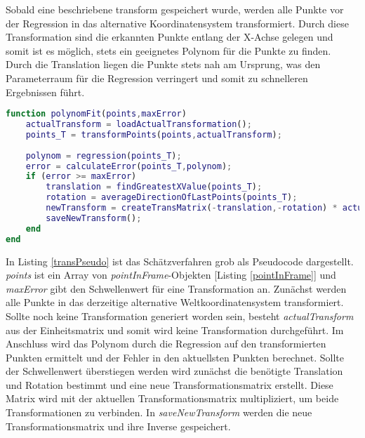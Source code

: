 Sobald eine beschriebene \gls{transform} gespeichert wurde, werden alle Punkte vor der Regression in das alternative Koordinatensystem transformiert. Durch diese Transformation sind die erkannten Punkte entlang der X-Achse gelegen und somit ist es möglich, stets ein geeignetes Polynom für die Punkte zu finden. Durch die Translation liegen die Punkte stets nah am Ursprung, was den Parameterraum für die Regression verringert und somit zu schnelleren Ergebnissen führt.\label{alterWorldCoords}
\begin{lstlisting}[language=Matlab,caption=Pseudocode des Schätzverfahrens,label=transPseudo]
function polynomFit(points,maxError)
	actualTransform = loadActualTransformation();
	points_T = transformPoints(points,actualTransform);
	
	polynom = regression(points_T);
	error = calculateError(points_T,polynom);
	if (error >= maxError)
		translation = findGreatestXValue(points_T);
		rotation = averageDirectionOfLastPoints(points_T);
		newTransform = createTransMatrix(-translation,-rotation) * actualTransform;
		saveNewTransform();
	end
end
\end{lstlisting}
In Listing \ref{transPseudo} ist das Schätzverfahren grob als Pseudocode dargestellt. \textit{points} ist ein Array von \textit{pointInFrame}-Objekten [Listing \ref{pointInFrame}] und \textit{maxError} gibt den Schwellenwert für eine Transformation an. Zunächst werden alle Punkte in das derzeitige alternative Weltkoordinatensystem transformiert. Sollte noch keine Transformation generiert worden sein, besteht \textit{actualTransform} aus der Einheitsmatrix und somit wird keine Transformation durchgeführt. Im Anschluss wird das Polynom durch die Regression auf den transformierten Punkten ermittelt und der Fehler in den aktuellsten Punkten berechnet. Sollte der Schwellenwert überstiegen werden wird zunächst die benötigte Translation und Rotation bestimmt und eine neue Transformationsmatrix erstellt. Diese Matrix wird mit der aktuellen Transformationsmatrix multipliziert, um beide Transformationen zu verbinden. In \textit{saveNewTransform} werden die neue Transformationsmatrix und ihre Inverse gespeichert.



